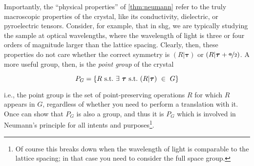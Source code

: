 Importantly, the ``physical properties'' of \cref{thm:neumann} refer to the truly macroscopic properties of the crystal, like its conductivity, dielectric, or pyroelectric tensors.
Consider, for example, that in \gls{shg}, we are typically studying the sample at optical wavelengths, where the wavelength of light is three or four orders of magnitude larger than the lattice spacing.
Clearly, then, these properties do not care whether the correct symmetry is $(R|\bm{\tau})$ or $(R|\bm{\tau}+\nicefrac{\bm{a}}{2})$.
A more useful group, then, is the \emph{point group} of the crystal

\begin{equation}
P_G = \{R~\mathrm{s.t.}~\exists~\bm{\tau}~\mathrm{s.t.}~(R|\bm{\tau})~\in~G\}
\end{equation}

i.e., the point group is the set of point-preserving operations $R$ for which $R$ appears in $G$, regardless of whether you need to perform a translation with it.
Once can show that $P_G$ is also a group, and thus it is $P_G$ which is involved in Neumann's principle for all intents and purposes\footnote{Of course this breaks down when the wavelength of light is comparable to the lattice spacing; in that case you need to consider the full space group.}.

